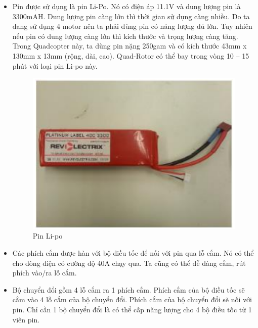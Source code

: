 \begin{itemize}
\item Pin được sử dụng là pin Li-Po. Nó có điện áp 11.1V và dung lượng pin là 3300mAH. Dung lượng pin càng lớn thì thời gian sử dụng càng nhiều. Do ta đang sử dụng 4 motor nên ta phải dùng pin có năng lượng đủ lớn. Tuy nhiên nếu pin có dung lượng càng lớn thì kích thước và trọng lượng càng tăng. Trong Quadcopter này, ta dùng pin nặng 250gam và có kích thước 43mm x 130mm x 13mm (rộng, dài, cao). Quad-Rotor có thể bay trong vòng 10 – 15 phút với loại pin Li-po này.
\begin{figure}[h!]
	        	\begin{center}
	        		\includegraphics[scale=0.8]{images/Cuong-Battery.png}
	        		\caption{Pin Li-po}
	        	\end{center}
        \end{figure}
\item Các phích cắm được hàn với bộ điều tốc để nối với pin qua lỗ cắm. Nó có thể cho dòng điện có cường độ 40A chạy qua. Ta cũng có thể dễ dàng cắm, rút phích vào/ra lỗ cắm.

\item Bộ chuyển đổi gồm 4 lỗ cắm ra 1 phích cắm. Phích cắm của bộ điều tốc sẽ cắm vào 4 lỗ cắm của bộ chuyển đổi. Phích cắm của bộ chuyển đổi sẽ nối với pin. Chỉ cần 1 bộ chuyển đổi là có thể cấp năng lượng cho 4 bộ điều tốc từ 1 viên pin.


\end{itemize}
